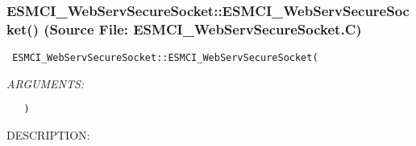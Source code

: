  
\setlength{\oldparskip}{\parskip}
\setlength{\parskip}{1.5ex}
\setlength{\oldparindent}{\parindent}
\setlength{\parindent}{0pt}
\setlength{\oldbaselineskip}{\baselineskip}
\setlength{\baselineskip}{11pt}
 
\def\bv{\begin{verbatim}}
\def\ev{\end{verbatim}}
\def\be{\begin{equation}}
\def\ee{\end{equation}}
\def\bea{\begin{eqnarray}}
\def\eea{\end{eqnarray}}
\def\bi{\begin{itemize}}
\def\ei{\end{itemize}}
\def\bn{\begin{enumerate}}
\def\en{\end{enumerate}}
\def\bd{\begin{description}}
\def\ed{\end{description}}
\def\({\left (}
\def\){\right )}
\def\[{\left [}
\def\]{\right ]}
\def\<{\left  \langle}
\def\>{\right \rangle}
\def\cI{{\cal I}}
\def\diag{\mathop{\rm diag}}
\def\tr{\mathop{\rm tr}}


 
\subsubsection{ESMCI\_WebServSecureSocket::ESMCI\_WebServSecureSocket() (Source File: ESMCI\_WebServSecureSocket.C)}


  
\begin{verbatim} ESMCI_WebServSecureSocket::ESMCI_WebServSecureSocket(\end{verbatim}{\em ARGUMENTS:}
\begin{verbatim}   )\end{verbatim}
{\sf DESCRIPTION:\\ }


